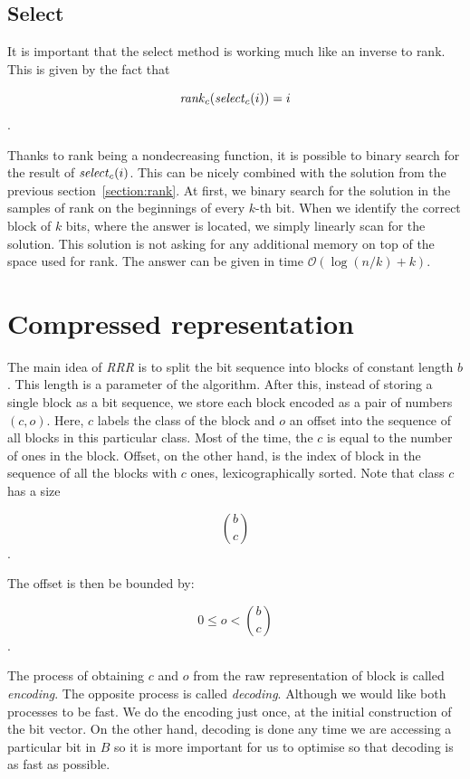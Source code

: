 
\subsection{Select}
\label{section:select}

It is important that the select method is working much like an inverse to rank. This is given
by the fact that

                $$\mathit{rank}_c(\mathit{select}_c(i)) = i$$.

Thanks to rank being a nondecreasing function, it is possible to binary search for the result
of $\mathit{select}_c(i)$. This can be nicely combined with the solution from the previous
section~\ref{section:rank}. At first, we binary search for the solution in the samples of rank
on the beginnings of every $k$-th bit. When we identify the correct block of $k$ bits, where
the answer is located, we simply linearly scan for the solution. This solution is not asking
for any additional memory on top of the space used for rank. The answer can be given in time
$\mathcal{O}(\log(n/k)+k)$.


\section{Compressed representation}

The main idea of \textit{RRR} is to split the bit sequence into blocks of constant length $b$.
This length is a parameter of the algorithm. After this, instead
of storing a single block as a bit sequence, we store each block encoded as a pair
of numbers $(c, o)$. Here, $c$ labels the class of the block and $o$ an offset into
the sequence of all blocks in this particular class. Most of the time, the $c$ is equal
to the number of ones in the block. Offset, on the other hand, is the index of block in
the sequence of all the blocks with $c$ ones, lexicographically sorted. Note that
class $c$ has a size

                $${b\choose c}$$.

The offset is then be bounded by:

				$$0 \leq o < {b\choose c}$$.

The process of obtaining $c$ and $o$ from the raw representation of block is called
\textit{encoding}. The opposite process is called \textit{decoding}. Although we would
like both processes to be fast. We do the encoding just once, at the initial construction
of the bit vector. On the other hand, decoding is done any time we are accessing a particular
bit in $B$ so it is more important for us to optimise so that decoding is as fast as possible.

